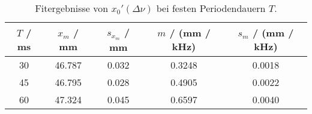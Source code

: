 \begin{table}[H]
\caption{Fitergebnisse von $x_0'(\Delta \nu)$ bei festen Periodendauern $T$.}
\begin{center}
\begin{tabular}{|c|c|c|c|c|}
  \hline
  $T$ / ms & $x_m$ / mm & $s_{x_m}$ / mm & $m$ / (mm / kHz) & $s_m$ / (mm / kHz) \\ \hline
  30 & 46.787 & 0.032 & 0.3248 & 0.0018 \\ \hline
  45 & 46.795 & 0.028 & 0.4905 & 0.0022 \\ \hline
  60 & 47.324 & 0.045 & 0.6597 & 0.0040 \\ \hline
\end{tabular}
\end{center}
\label{tab:fit:x0}
\end{table}
